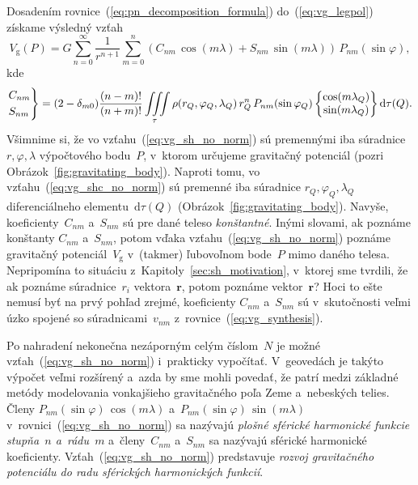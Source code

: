 \documentclass[a4paper,12pt]{book}
\newcommand{\diff}{\mathrm d}
\newcommand{\gidx}{\mathrm g}
\let\vec\mathbf
\begin{document}
Dosadením rovnice~(\ref{eq:pn_decomposition_formula}) do~(\ref{eq:vg_legpol})
získame výsledný vzťah
%
\begin{equation}
\label{eq:vg_sh_no_norm}
V_\gidx(P) = G \sum_{n = 0}^\infty \frac{1}{r^{n + 1}} \sum_{m = 0}^{n} \left(
C_{nm} \, \cos(m\lambda) + S_{nm} \, \sin(m\lambda)\right) \,
P_{nm}(\sin\varphi){,}
\end{equation}
%
kde
%
\begin{equation}
\label{eq:vg_shc_no_norm}
\begin{rcases}
C_{nm}\\
S_{nm}
\end{rcases}
= (2 - \delta_{m0}) \frac{(n - m)!}{(n + m)!} \iiint\limits_{\tau} \rho(r_Q,
\varphi_Q, \lambda_Q) \, r_Q^n \, P_{nm}(\sin\varphi_Q)
%
\begin{Bmatrix}
\cos(m\lambda_Q)\\
\sin(m\lambda_Q)
\end{Bmatrix}
%
\diff\tau(Q){.}
\end{equation}
%
Všimnime si, že vo vzťahu~(\ref{eq:vg_sh_no_norm}) sú premennými iba súradnice
$r, \varphi, \lambda$ výpočtového bodu~$P$, v~ktorom určujeme gravitačný
potenciál (pozri Obrázok~\ref{fig:gravitating_body}).  Naproti tomu, vo
vzťahu~(\ref{eq:vg_shc_no_norm}) sú premenné iba súradnice $r_Q,\varphi_Q,
\lambda_Q$ diferenciálneho elementu~$\diff\tau(Q)$
(Obrázok~\ref{fig:gravitating_body}).  Navyše, koeficienty~$C_{nm}$ a~$S_{nm}$
sú pre dané teleso \emph{konštantné}.  Inými slovami, ak poznáme konštanty
$C_{nm}$ a~$S_{nm}$, potom vďaka vzťahu~(\ref{eq:vg_sh_no_norm}) poznáme
gravitačný potenciál~$V_\gidx$ v~(takmer) ľubovoľnom bode~$P$ mimo daného
telesa.  Nepripomína to situáciu z~Kapitoly~\ref{sec:sh_motivation}, v~ktorej
sme tvrdili, že ak poznáme súradnice~$r_i$ vektora~$\vec r$, potom poznáme
vektor~$\vec r$?  Hoci to ešte nemusí byť na prvý pohľad zrejmé, koeficienty
$C_{nm}$ a~$S_{nm}$ sú v~skutočnosti veľmi úzko spojené so súradnicami~$v_{nm}$
z~rovnice~(\ref{eq:vg_synthesis}).

Po nahradení nekonečna nezáporným celým číslom~$N$ je možné 
vzťah~(\ref{eq:vg_sh_no_norm}) i~prakticky vypočítať.  V~geovedách je takýto
výpočet veľmi rozšírený a~azda by sme mohli povedať, že patrí medzi základné  
metódy modelovania vonkajšieho
gravitačného poľa Zeme a~nebeských telies.  Členy $P_{nm}(\sin\varphi) \,
\cos(m\lambda)$ a~$ P_{nm}(\sin\varphi) \, \sin(m\lambda)$
v~rovnici~(\ref{eq:vg_sh_no_norm}) sa nazývajú \emph{plošné sférické harmonické
funkcie stupňa~$n$ a~rádu~$m$} a~členy~$C_{nm}$ a~$S_{nm}$ sa nazývajú sférické
harmonické koeficienty.  Vzťah~(\ref{eq:vg_sh_no_norm}) predstavuje
\emph{rozvoj gravitačného potenciálu do radu sférických harmonických funkcií}.
\end{document}
